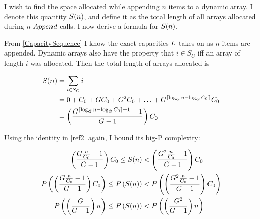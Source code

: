 \HdrSpaceComplex

I wish to find the space allocated while appending $n$ items to a dynamic array. I denote this quantity $S(n)$, and define it as the total length of all arrays allocated during $n$ $Append$ calls. I now derive a formula for $S(n)$.

From \ref{CapacitySequence} I know the exact capacities $L$ takes on as $n$ items are appended. Dynamic arrays also have the property that $i \in S_C$ iff an array of length $i$ was allocated. Then the total length of arrays allocated is

\begin{align*}
S(n) &= \sum_{i \in S_C} i\\
&= 0 + C_0 + GC_0 + G^2C_0 + \ldots + G^{\lceil \log_{G} n - \log_{G} C_0 \rceil}C_0\\
&= \left( \frac{G^{\lceil \log_{G} n - \log_{G} C_0 \rceil + 1} - 1}{G - 1} \right) C_0
\end{align*}

Using the identity in [ref2] again, I bound its big-P complexity:

\begin{align*}
\left( \frac{G \frac{n}{C_0} - 1}{G - 1} \right) C_0 \leq S(n) &< \left( \frac{G^2 \frac{n}{C_0} - 1}{G - 1} \right) C_0\\
P\left( \left( \frac{G \frac{n}{C_0} - 1}{G - 1} \right) C_0 \right) \leq P\left( S(n) \right) &< P\left( \left( \frac{G^2 \frac{n}{C_0} - 1}{G - 1} \right) C_0 \right)\\
P\left( \left( \frac{G}{G - 1} \right) n \right) \leq P\left( S(n) \right) &< P\left( \left( \frac{G^2}{G - 1} \right) n \right)
\end{align*}